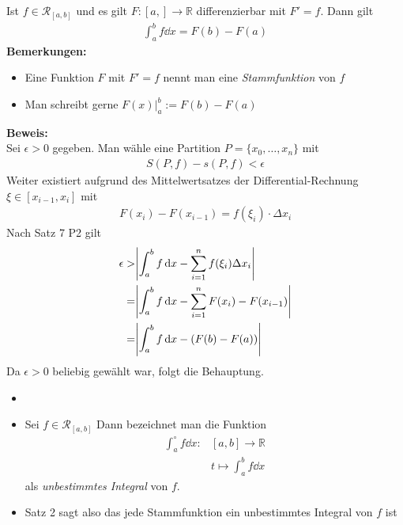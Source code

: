 \begin{Satz}{
	Ist $f \in \mathcal{R}_{[a,b]}$ und es gilt $F: [a,] \rightarrow \mathbb{R}$
	differenzierbar mit $F' = f$. Dann gilt
	\begin{align*}
		\int_a^b f\dd{x} = F(b) - F(a) 
	\end{align*}
	\textbf{Bemerkungen:}
	\begin{itemize}
		\item Eine Funktion $F$ mit $F'=f$ nennt man eine \emph{Stammfunktion} 
		von $f$
		\item Man schreibt gerne $F(x) \vert_a^b := F(b) -F(a)$
	\end{itemize}
	\textbf{Beweis:}\\
	Sei $\epsilon >0 $ gegeben. Man wähle eine Partition $P = \{x_0, \hdots, x_n\}$ 
	mit 
	\begin{align*}
		S(P,f) - s(P,f) < \epsilon
	\end{align*}
	Weiter existiert aufgrund des Mittelwertsatzes der Differential-Rechnung %
	$\xi \in [x_{i-1}, x_i]$ mit 
	\begin{align*}
		F(x_i) - F(x_{i-1}) = f(\xi_i) \cdot \Delta x_i
	\end{align*}
	Nach Satz 7 P2 %
	gilt 
	\begin{align*}
		\epsilon > & \abs{ \int_a^b f \dd{x} - \sum_{i=1}^n f(\xi_i) \Delta x_i} \\
		= & \abs{ \int_a^b f \dd{x} - \sum_{i=1}^n F(x_i) -F(x_{i-1})} \\
		= & \abs{ \int_a^b f \dd{x} - (F(b) -F(a))}
	\end{align*}
	Da $\epsilon > 0$ beliebig gewählt war, folgt die Behauptung.	
}\end{Satz}

\begin{Bemerkung}{
	\begin{itemize}
	\item[ ]
		\item Sei $f \in \mathcal{R}_{[a,b]}$ Dann bezeichnet man die Funktion 
		\begin{align*}
			\int_a^{\circ} f\dd{x} : & [a,b] \rightarrow \mathbb{R} \\
			& t \mapsto \int_a^b f\dd{x}
		\end{align*}
		als \emph{unbestimmtes Integral} von $f$.
		\item Satz 2 %
		sagt also das jede Stammfunktion ein unbestimmtes Integral von $f$ ist 
	\end{itemize}
}\end{Bemerkung}

